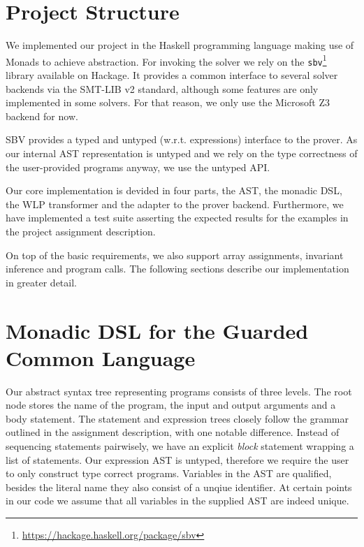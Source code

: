 \documentclass[]{scrartcl}
\begin{document}
\section{Project Structure}

We implemented our project in the Haskell programming language making use of
Monads to achieve abstraction.
For invoking the solver we rely on the \texttt{sbv}\footnote{\url{https://hackage.haskell.org/package/sbv}}
library available on Hackage.
It provides a common interface to several solver backends via the SMT-LIB v2 standard,
although some features are only implemented in some solvers.
For that reason, we only use the Microsoft Z3 backend for now.

SBV provides a typed and untyped (w.r.t. expressions) interface to the prover.
As our internal AST representation is untyped and we rely on the type correctness of
the user-provided programs anyway, we use the untyped API.

Our core implementation is devided in four parts, the AST, the monadic DSL, the WLP transformer
and the adapter to the prover backend.
Furthermore, we have implemented a test suite asserting the expected results for the examples
in the project assignment description.

On top of the basic requirements, we also support array assignments, invariant inference and
program calls. The following sections describe our implementation in greater detail.

\section{Monadic DSL for the Guarded Common Language}

Our abstract syntax tree representing programs consists of three levels.
The root node stores the name of the program, the input and output arguments and a body statement.
The statement and expression trees closely follow the grammar outlined in the assignment description,
with one notable difference. Instead of sequencing statements pairwisely, we have an explicit \emph{block}
statement wrapping a list of statements.
Our expression AST is untyped, therefore we require the user to only construct type correct programs.
Variables in the AST are qualified, besides the literal name they also consist of a unqiue identifier.
At certain points in our code we assume that all variables in the supplied AST are indeed unique.
\end{document}
